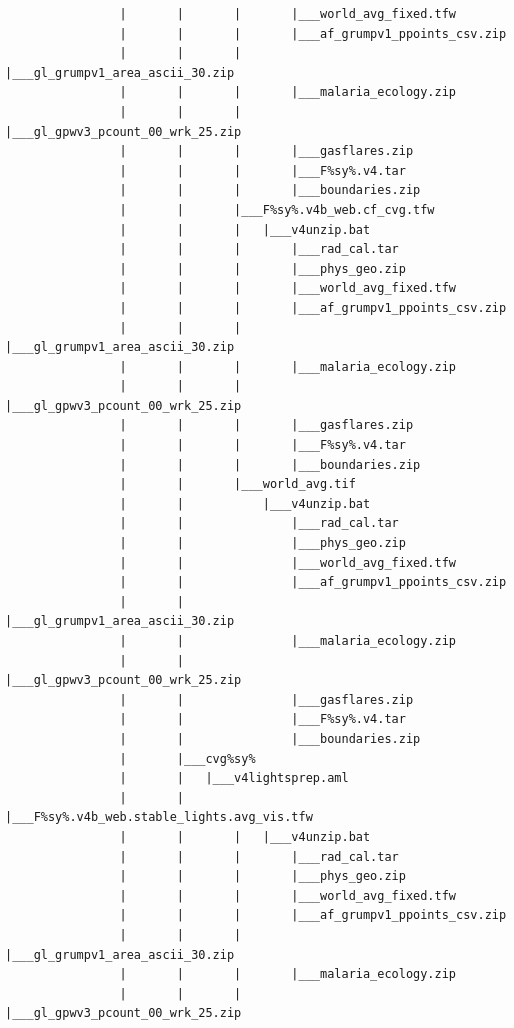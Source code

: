 \documentclass[]{book}
\begin{document}
\begin{verbatim}
                |       |       |       |___world_avg_fixed.tfw
                |       |       |       |___af_grumpv1_ppoints_csv.zip
                |       |       |       |___gl_grumpv1_area_ascii_30.zip
                |       |       |       |___malaria_ecology.zip
                |       |       |       |___gl_gpwv3_pcount_00_wrk_25.zip
                |       |       |       |___gasflares.zip
                |       |       |       |___F%sy%.v4.tar
                |       |       |       |___boundaries.zip
                |       |       |___F%sy%.v4b_web.cf_cvg.tfw
                |       |       |   |___v4unzip.bat
                |       |       |       |___rad_cal.tar
                |       |       |       |___phys_geo.zip
                |       |       |       |___world_avg_fixed.tfw
                |       |       |       |___af_grumpv1_ppoints_csv.zip
                |       |       |       |___gl_grumpv1_area_ascii_30.zip
                |       |       |       |___malaria_ecology.zip
                |       |       |       |___gl_gpwv3_pcount_00_wrk_25.zip
                |       |       |       |___gasflares.zip
                |       |       |       |___F%sy%.v4.tar
                |       |       |       |___boundaries.zip
                |       |       |___world_avg.tif
                |       |           |___v4unzip.bat
                |       |               |___rad_cal.tar
                |       |               |___phys_geo.zip
                |       |               |___world_avg_fixed.tfw
                |       |               |___af_grumpv1_ppoints_csv.zip
                |       |               |___gl_grumpv1_area_ascii_30.zip
                |       |               |___malaria_ecology.zip
                |       |               |___gl_gpwv3_pcount_00_wrk_25.zip
                |       |               |___gasflares.zip
                |       |               |___F%sy%.v4.tar
                |       |               |___boundaries.zip
                |       |___cvg%sy%
                |       |   |___v4lightsprep.aml
                |       |       |___F%sy%.v4b_web.stable_lights.avg_vis.tfw
                |       |       |   |___v4unzip.bat
                |       |       |       |___rad_cal.tar
                |       |       |       |___phys_geo.zip
                |       |       |       |___world_avg_fixed.tfw
                |       |       |       |___af_grumpv1_ppoints_csv.zip
                |       |       |       |___gl_grumpv1_area_ascii_30.zip
                |       |       |       |___malaria_ecology.zip
                |       |       |       |___gl_gpwv3_pcount_00_wrk_25.zip

\end{verbatim}
\end{document}

